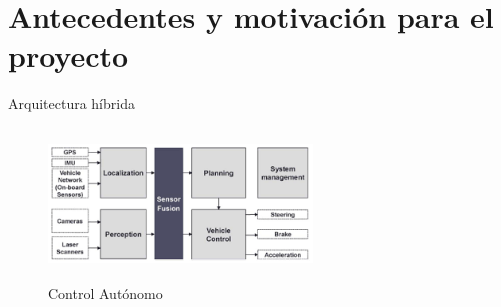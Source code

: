 \documentclass[
	11pt, %
]{beamer}
\begin{document}
\section{Antecedentes y motivación para el proyecto}
\begin{frame}{Arquitectura híbrida}
  \begin{figure}
    \centering
    \includegraphics[width=7cm, height=4cm]{control_autonomo}
    \caption[Caption for LOF]{Control Aut\'{o}nomo\protect\footnotemark}
  \end{figure}
\end{frame}
\end{document}
